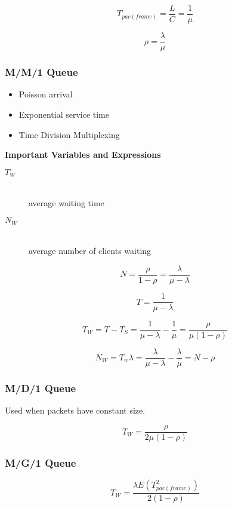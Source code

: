 \documentclass[../resumosRCOM.tex]{subfiles}
\begin{document}
\begin{equation}
    T_{pac(frame)} = \frac{L}{C} = \frac{1}{\mu}
\end{equation}

\begin{equation}
    \rho = \frac{\lambda}{\mu}
\end{equation}

\subsubsection{M/M/1 Queue}

\begin{itemize}
    \item Poisson arrival
    \item Exponential service time
    \item Time Division Multiplexing
\end{itemize}

\textbf{Important Variables and Expressions}
\begin{description}
    \item[\(T_{W}\)] \hfill \\ average waiting time
    \item[\(N_{W}\)] \hfill \\ average number of clients waiting
\end{description}

\begin{equation}
    N = \frac{\rho}{1-\rho} = \frac{\lambda}{\mu-\lambda}
\end{equation}

\begin{equation}
    T = \frac{1}{\mu-\lambda}
\end{equation}

\begin{equation}
    T_{W} = T - T_{S} = \frac{1}{\mu-\lambda} - \frac{1}{\mu} = \frac{\rho}{\mu(1-\rho)}
\end{equation}

\begin{equation}
    N_{W} = T_{w}\lambda = \frac{\lambda}{\mu-\lambda} - \frac{\lambda}{\mu} = N - \rho
\end{equation}

\subsubsection{M/D/1 Queue}

Used when packets have constant size.

\begin{equation}
    T_{W} = \frac{\rho}{2\mu(1-\rho)}
\end{equation}

\subsubsection{M/G/1 Queue}

\begin{equation}
    T_{W} = \frac{\lambda E(T_{pac(frame)}^2)}{2(1-\rho)}
\end{equation}
\end{document}
